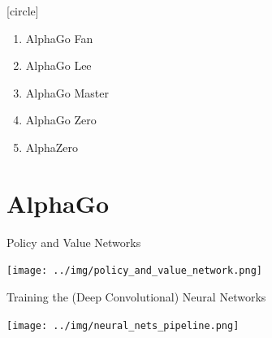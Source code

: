 \documentclass{beamer}
\begin{document}
  {
    [circle]{\color{white}}
    \begin{frame}[standout]
      \pause
      \begin{enumerate}[<+- | alert@+>]
        \item AlphaGo Fan
        \item AlphaGo Lee
        \item AlphaGo Master
        \item AlphaGo Zero
        \item AlphaZero
      \end{enumerate}
    \end{frame}
  }


  \section{AlphaGo}
  {

    \begin{frame}{Policy and Value Networks}
      \begin{center}
        \texttt{[image: ../img/policy\_and\_value\_network.png]}
      \end{center}
    \end{frame}

    \begin{frame}{Training the (Deep Convolutional) Neural Networks}
      \begin{center}
        \texttt{[image: ../img/neural\_nets\_pipeline.png]}
      \end{center}
    \end{frame}
  }

\end{document}
